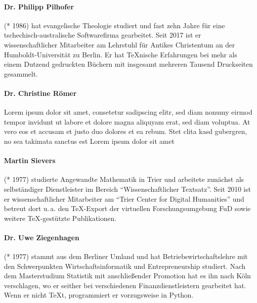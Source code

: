 \paragraph{Dr. Philipp Pilhofer} (* 1986) hat evangelische Theologie studiert und fast zehn Jahre für eine tschechisch-australische Softwarefirma gearbeitet. Seit 2017 ist er wissenschaftlicher Mitarbeiter am Lehrstuhl für Antikes Christentum an der Humboldt-Universität zu Berlin. Er hat \TeX{}nische Erfahrungen bei mehr als einem Dutzend gedruckten Büchern mit insgesamt mehreren Tausend Druckseiten gesammelt.

\paragraph{Dr. Christine Römer} Lorem ipsum dolor sit amet, consetetur sadipscing elitr, sed diam nonumy eirmod tempor invidunt ut labore et dolore magna aliquyam erat, sed diam voluptua. At vero eos et accusam et justo duo dolores et ea rebum. Stet clita kasd gubergren, no sea takimata sanctus est Lorem ipsum dolor sit amet

\paragraph{Martin Sievers} (* 1977) studierte Angewandte Mathematik in Trier und arbeitete zunächst als selbständiger Dienstleister im Bereich \enquote{Wissenschaftlicher Textsatz}. Seit 2010 ist er wissenschaftlicher Mitarbeiter am \enquote{Trier Center for Digital Humanities} und betreut dort u.\,a. den \TeX-Export der virtuellen Forschungsumgebung FuD sowie weitere \TeX-gestützte Publikationen.

\paragraph{Dr. Uwe Ziegenhagen} (* 1977) stammt aus dem Berliner Umland und hat Betriebswirtschaftslehre mit den Schwerpunkten Wirtschaftsinformatik und Entrepreneurship studiert. Nach dem Masterstudium Statistik mit anschließender Promotion hat es ihn nach Köln verschlagen, wo er seither bei verschiedenen Finanzdienstleistern gearbeitet hat. Wenn er nicht \TeX t, programmiert er vorzugsweise in Python.
